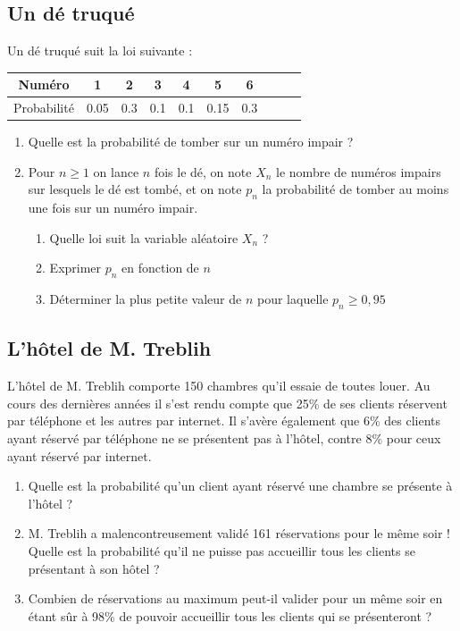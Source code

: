 \documentclass[oneside,12pt]{book}          %
\begin{document}
\subsection{Un dé truqué}
Un dé truqué suit la loi suivante :

\renewcommand{\arraystretch}{1.5}
\setlength{\tabcolsep}{15pt}
\begin{center}
\begin{tabular}{|c|c|c|c|c|c|c|c|c|c|} \hline
Numéro & 1 & 2 & 3 & 4 & 5 & 6 \\ \hline
Probabilité & 0.05 & 0.3 & 0.1 & 0.1 & 0.15 & 0.3\\ \hline 
\end{tabular}
\end{center}

\begin{enumerate}
    \item Quelle est la probabilité de tomber sur un numéro impair ?
    \item Pour $n\geq1$ on lance $n$ fois le dé, on note $X_n$ le nombre de numéros impairs sur lesquels le dé est tombé, et on note $p_n$ la probabilité de tomber au moins une fois sur un numéro impair.
    \begin{enumerate}
        \item Quelle loi suit la variable aléatoire $X_n$ ?
        \item Exprimer $p_n$ en fonction de $n$
        \item Déterminer la plus petite valeur de $n$ pour laquelle $p_n\geq0,95$
    \end{enumerate}
\end{enumerate}



\subsection{L'hôtel de M. Treblih}
L'hôtel de M. Treblih comporte 150 chambres qu'il essaie de toutes louer. Au cours des dernières années il s'est rendu compte que 25\% de ses clients réservent par téléphone et les autres par internet. Il s'avère également que 6\% des clients ayant réservé par téléphone ne se présentent pas à l'hôtel, contre 8\% pour ceux ayant réservé par internet.
\begin{enumerate}
    \item Quelle est la probabilité qu'un client ayant réservé une chambre se présente à l'hôtel ?
    \item M. Treblih a malencontreusement validé 161 réservations pour le même soir ! Quelle est la probabilité qu'il ne puisse pas accueillir tous les clients se présentant à son hôtel ?
    \item[\faCalculator] Combien de réservations au maximum peut-il valider pour un même soir en étant sûr à 98\% de pouvoir accueillir tous les clients qui se présenteront ?
\end{enumerate}
\end{document}

